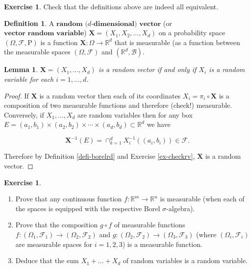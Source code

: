 \documentclass[11pt]{report}
\providecommand{\cal}{\mathcal}
\newcommand{\R}{\mathbb{R}}
\theoremstyle{plain}
\newtheorem{lem}[thm]{Lemma}
\theoremstyle{definition}
\newtheorem{defn}[thm]{Definition}
\newtheorem{xexercise}[thm]{Exercise}
\begin{document}
\begin{xexercise}
Check that the definitions above are indeed all
equivalent.
\end{xexercise}

\begin{defn}
A $\textbf{random ($d$-dimensional) vector}$ (or
$\textbf{vector random variable}$)
$\mathbf{X}=(X_1,X_2,\ldots,X_d)$ on a probability
space $(\Omega, {\cal F}, \mathrm{P})$ is a function
$\mathbf{X}:\Omega\to\R^d$ that is measurable (as a
function between the measurable spaces
$(\Omega, {\cal F})$ and $(\R^d, {\cal B})$.
\end{defn}

\begin{lem}
$\mathbf{X}=(X_1,\ldots,X_d)$ is a random vector if
and only if $X_i$ is a random variable for each
$i=1,\ldots,d$.
\end{lem}

\begin{proof}
If $\mathbf{X}$ is a random vector then each of its
coordinates $X_i = \pi_i \circ \mathbf{X}$ is a
composition of two measurable functions and therefore
(check!) measurable. Conversely, if $X_1,\ldots,X_d$
are random variables then for any box
$E=(a_1,b_1)\times (a_2,b_2)\times\cdots\times
(a_d,b_d) \subset \R^d$
we have

\[
\mathbf{X}^{-1}(E) = \cap_{k=1}^d X_i^{-1}((a_i,b_i)) \in {\cal F}.
\]

Therefore by Definition \ref{defi-borelrd} and Exercise
\ref{ex-checkrv}, $\mathbf{X}$ is a random vector.
\end{proof}

\begin{xexercise}

\begin{enumerate}[label=(\roman*)]
\item Prove that any continuous function $f:\R^m\to\R^n$ is
measurable (when each of the spaces is equipped with
the respective Borel $\sigma$-algebra).

\item Prove that the composition $g\circ f$ of measurable
functions
$f:(\Omega_1, {\cal F}_1)\to (\Omega_2,{\cal F}_2)$
and
$g:(\Omega_2, {\cal F}_2)\to (\Omega_3, {\cal F}_3)$
(where $(\Omega_i, {\cal F}_i)$ are measurable spaces
for $i=1,2,3$) is a measurable function.

\item Deduce that the sum $X_1+\ldots+X_d$ of random
variables is a random variable.
\end{enumerate}

\end{xexercise}
\end{document}
